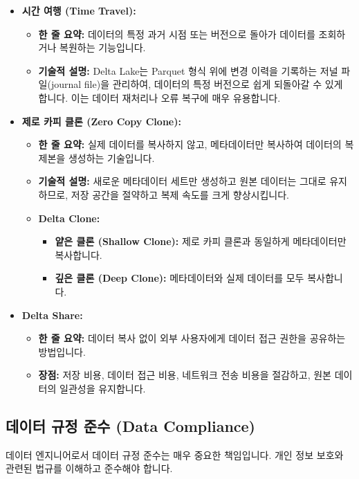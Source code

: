\documentclass[11pt,a4paper]{article}
\begin{document}
\begin{itemize}
    \item \textbf{시간 여행 (Time Travel):}
    \begin{itemize}
        \item \textbf{한 줄 요약:} 데이터의 특정 과거 시점 또는 버전으로 돌아가 데이터를 조회하거나 복원하는 기능입니다.
        \item \textbf{기술적 설명:} Delta Lake는 Parquet 형식 위에 변경 이력을 기록하는 저널 파일(journal file)을 관리하여, 데이터의 특정 버전으로 쉽게 되돌아갈 수 있게 합니다. 이는 데이터 재처리나 오류 복구에 매우 유용합니다.
    \end{itemize}
    \item \textbf{제로 카피 클론 (Zero Copy Clone):}
    \begin{itemize}
        \item \textbf{한 줄 요약:} 실제 데이터를 복사하지 않고, 메타데이터만 복사하여 데이터의 복제본을 생성하는 기술입니다.
        \item \textbf{기술적 설명:} 새로운 메타데이터 세트만 생성하고 원본 데이터는 그대로 유지하므로, 저장 공간을 절약하고 복제 속도를 크게 향상시킵니다.
        \item \textbf{Delta Clone:}
        \begin{itemize}
            \item \textbf{얕은 클론 (Shallow Clone):} 제로 카피 클론과 동일하게 메타데이터만 복사합니다.
            \item \textbf{깊은 클론 (Deep Clone):} 메타데이터와 실제 데이터를 모두 복사합니다.
        \end{itemize}
    \end{itemize}
    \item \textbf{Delta Share:}
    \begin{itemize}
        \item \textbf{한 줄 요약:} 데이터 복사 없이 외부 사용자에게 데이터 접근 권한을 공유하는 방법입니다.
        \item \textbf{장점:} 저장 비용, 데이터 접근 비용, 네트워크 전송 비용을 절감하고, 원본 데이터의 일관성을 유지합니다.
    \end{itemize}
\end{itemize}

\subsection{데이터 규정 준수 (Data Compliance)}
데이터 엔지니어로서 데이터 규정 준수는 매우 중요한 책임입니다. 개인 정보 보호와 관련된 법규를 이해하고 준수해야 합니다.
\end{document}
